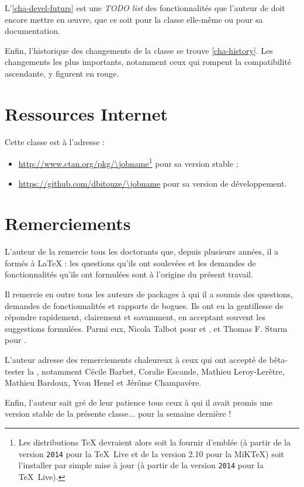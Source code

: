 L'\vref{cha-devel-futurs} est une \emph{TODO list} des fonctionnalités que
l'auteur de \yat{} doit encore mettre en œuvre, que ce soit pour la classe
elle-même ou pour sa documentation.

Enfin, l'historique des changements de la classe se trouve \vref{cha-history}.
Les changements les plus importants, notamment ceux qui rompent la compatibilité
ascendante, y figurent en rouge.

\section{Ressources Internet}
\label{sec-ressources-internet}

Cette classe est  à l'adresse :
\begin{itemize}
\item \url{http://www.ctan.org/pkg/\jobname}\footnote{Les distributions \TeX{}
    devraient alors soit la fournir d'emblée (à partir de la version
    \texttt{2014} pour la \TeX~Live et de la version 2.10 pour la MiK\TeX{})
    soit l'installer par simple mise à jour (à partir de la version
    \texttt{2014} pour la \TeX~Live).}  pour sa version stable ;
\item \url{https://github.com/dbitouze/\jobname} pour sa version de
  développement.
\end{itemize}

\section{Remerciements}
\label{sec-remerciements}

L'auteur de la \yatcl{} remercie tous les doctorants que, depuis plusieurs
années, il a formés à \LaTeX{} : les questions qu'ils ont soulevées et les
demandes de fonctionnalités qu'ils ont formulées sont à l'origine du présent
travail.

Il remercie en outre tous les auteurs de packages à qui il a soumis  des questions, demandes de fonctionnalités et rapports
de bogues. Ils ont eu la gentillesse de répondre rapidement, clairement et
savamment, en acceptant souvent les suggestions formulées. Parmi eux, Nicola
Talbot pour  et , et Thomas F. Sturm
pour .

L'auteur adresse des remerciements chaleureux à ceux qui ont accepté de
bêta-tester la \yatcl{}, notamment Cécile Barbet, Coralie Escande, Mathieu
Leroy-Lerêtre, Mathieu Bardoux, Yvon Henel et Jérôme Champavère.

Enfin, l'auteur sait gré de leur patience tous ceux à qui il avait promis une
version stable de la présente classe... pour la semaine dernière !

%
\iffalse
\fi
